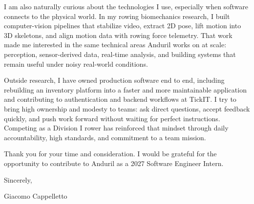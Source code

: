 \documentclass[letterpaper,11pt]{article}
\begin{document}
\vspace{0.2in}

I am also naturally curious about the technologies I use, especially when software connects to the physical world. In my rowing biomechanics research, I built computer-vision pipelines that stabilize video, extract 2D pose, lift motion into 3D skeletons, and align motion data with rowing force telemetry. That work made me interested in the same technical areas Anduril works on at scale: perception, sensor-derived data, real-time analysis, and building systems that remain useful under noisy real-world conditions.

\vspace{0.2in}

Outside research, I have owned production software end to end, including rebuilding an inventory platform into a faster and more maintainable application and contributing to authentication and backend workflows at TickIT. I try to bring high ownership and modesty to teams: ask direct questions, accept feedback quickly, and push work forward without waiting for perfect instructions. Competing as a Division I rower has reinforced that mindset through daily accountability, high standards, and commitment to a team mission.

\vspace{0.2in}

Thank you for your time and consideration. I would be grateful for the opportunity to contribute to Anduril as a 2027 Software Engineer Intern.

\vspace{0.2in}

Sincerely,

\vspace{0.1in}

Giacomo Cappelletto
\end{document}
